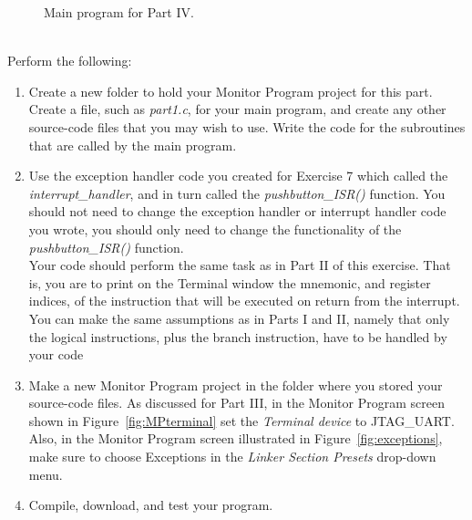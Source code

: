 \documentclass[epsfig,10pt,fullpage]{article}
\begin{document}
\begin{figure}[htb]
\begin{center}

\end{center}
\caption{Main program for Part IV.}
\label{fig:C_code2}
\end{figure}

~\\
\noindent
Perform the following:

\begin{enumerate}
\item Create a new folder to hold your Monitor Program project for this part. Create a
file, such as {\it part1.c}, for your main program, and create any other source-code files 
that you may wish to use.  Write the code for the subroutines that are called by the 
main program.

\item 
Use the exception handler code you created for Exercise 7 which called the {\it interrupt\_handler},
and in turn called the {\it pushbutton\_ISR()} function. You should not need to change the exception 
handler or interrupt handler code you wrote, you should only need to change the functionality of the
{\it pushbutton\_ISR()} function.  
~\\
Your code should perform the same task as in Part II of this exercise. That is, you are to
print on the Terminal window the mnemonic, and register indices, of the instruction that 
will be executed on return from the interrupt. You can make the same assumptions as in
Parts I and II, namely that only the logical instructions, plus the branch instruction,
have to be handled by your code

\item
Make a new Monitor Program project in the folder where you stored your source-code files.
As discussed for Part III, in the Monitor Program screen shown in 
Figure~\ref{fig:MPterminal} set the {\it Terminal device} to {\sf JTAG\_UART}.
Also, in the Monitor Program screen illustrated in Figure~\ref{fig:exceptions}, make sure 
to choose {\sf Exceptions} in the {\it Linker Section Presets} drop-down menu.

\item
Compile, download, and test your program. 
\end{enumerate}
\end{document}
